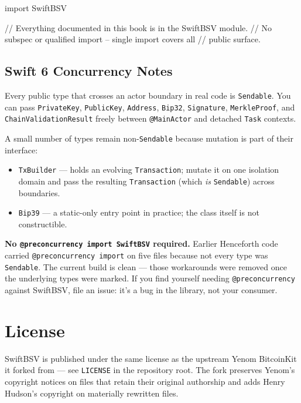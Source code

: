 \documentclass[a4paper, 11pt, openany]{book}
\begin{document}
\begin{forthbox}
import SwiftBSV

// Everything documented in this book is in the SwiftBSV module.
// No subspec or qualified import -- single import covers all
// public surface.
\end{forthbox}

\subsection{Swift 6 Concurrency Notes}

Every public type that crosses an actor boundary in real code is \texttt{Sendable}. You can pass \texttt{PrivateKey}, \texttt{PublicKey}, \texttt{Address}, \texttt{Bip32}, \texttt{Signature}, \texttt{MerkleProof}, and \texttt{ChainValidationResult} freely between \texttt{@MainActor} and detached \texttt{Task} contexts.

A small number of types remain non-\texttt{Sendable} because mutation is part of their interface:

\begin{itemize}
\item \texttt{TxBuilder} --- holds an evolving \texttt{Transaction}; mutate it on one isolation domain and pass the resulting \texttt{Transaction} (which \emph{is} \texttt{Sendable}) across boundaries.
\item \texttt{Bip39} --- a static-only entry point in practice; the class itself is not constructible.
\end{itemize}

\begin{notebox}
\textbf{No \texttt{@preconcurrency import SwiftBSV} required.} Earlier Henceforth code carried \texttt{@preconcurrency import} on five files because not every type was \texttt{Sendable}. The current build is clean --- those workarounds were removed once the underlying types were marked. If you find yourself needing \texttt{@preconcurrency} against SwiftBSV, file an issue: it's a bug in the library, not your consumer.
\end{notebox}

\section{License}

SwiftBSV is published under the same license as the upstream Yenom BitcoinKit it forked from --- see \texttt{LICENSE} in the repository root. The fork preserves Yenom's copyright notices on files that retain their original authorship and adds Henry Hudson's copyright on materially rewritten files.
\end{document}
